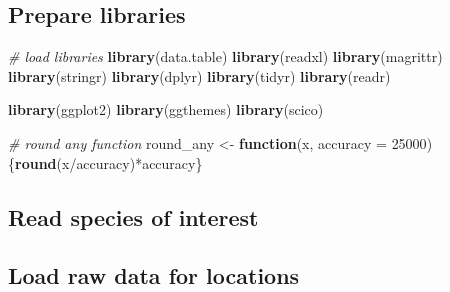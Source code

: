 \documentclass[]{article}
\newenvironment{Shaded}{}{}
\newcommand{\CommentTok}[1]{\textcolor[rgb]{0.38,0.63,0.69}{\textit{#1}}}
\newcommand{\ControlFlowTok}[1]{\textcolor[rgb]{0.00,0.44,0.13}{\textbf{#1}}}
\newcommand{\DataTypeTok}[1]{\textcolor[rgb]{0.56,0.13,0.00}{#1}}
\newcommand{\DecValTok}[1]{\textcolor[rgb]{0.25,0.63,0.44}{#1}}
\newcommand{\KeywordTok}[1]{\textcolor[rgb]{0.00,0.44,0.13}{\textbf{#1}}}
\newcommand{\NormalTok}[1]{#1}
\newcommand{\OperatorTok}[1]{\textcolor[rgb]{0.40,0.40,0.40}{#1}}
\newcommand{\StringTok}[1]{\textcolor[rgb]{0.25,0.44,0.63}{#1}}
\begin{document}
\hypertarget{prepare-libraries-1}{%
\subsection{Prepare libraries}\label{prepare-libraries-1}}

\begin{Shaded}
\begin{Highlighting}[]
\CommentTok{# load libraries}
\KeywordTok{library}\NormalTok{(data.table)}
\KeywordTok{library}\NormalTok{(readxl)}
\KeywordTok{library}\NormalTok{(magrittr)}
\KeywordTok{library}\NormalTok{(stringr)}
\KeywordTok{library}\NormalTok{(dplyr)}
\KeywordTok{library}\NormalTok{(tidyr)}
\KeywordTok{library}\NormalTok{(readr)}

\KeywordTok{library}\NormalTok{(ggplot2)}
\KeywordTok{library}\NormalTok{(ggthemes)}
\KeywordTok{library}\NormalTok{(scico)}

\CommentTok{# round any function}
\NormalTok{round_any <-}\StringTok{ }\ControlFlowTok{function}\NormalTok{(x, }\DataTypeTok{accuracy =} \DecValTok{25000}\NormalTok{)\{}\KeywordTok{round}\NormalTok{(x}\OperatorTok{/}\NormalTok{accuracy)}\OperatorTok{*}\NormalTok{accuracy\}}
\end{Highlighting}
\end{Shaded}

\hypertarget{read-species-of-interest}{%
\subsection{Read species of interest}\label{read-species-of-interest}}

\begin{Shaded}
\end{Shaded}

\hypertarget{load-raw-data-for-locations}{%
\subsection{Load raw data for locations}\label{load-raw-data-for-locations}}
\end{document}
